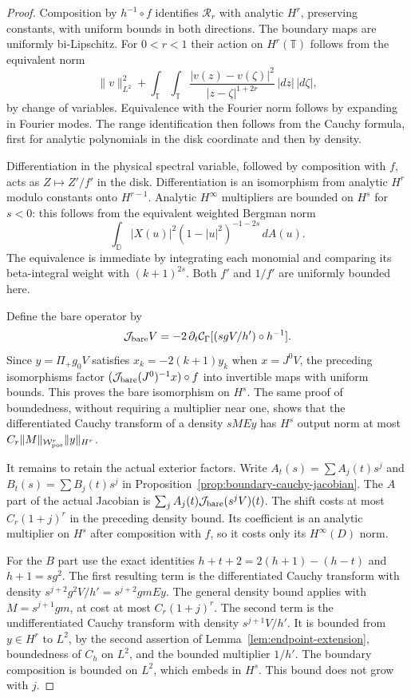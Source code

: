 \documentclass[11pt]{article}
\newcommand{\T}{\mathbb T}
\begin{document}
\begin{proof}
Composition by $h^{-1}\circ f$ identifies $\mathcal R_r$ with
analytic $H^r$, preserving constants, with uniform bounds in
both directions. The boundary maps are uniformly bi-Lipschitz.
For $0<r<1$ their action on $H^r(\T)$ follows from the
equivalent norm
\[
 \|v\|_{L^2}^2+
  \int_\T\int_\T
     \frac{|v(z)-v(\zeta)|^2}{|z-\zeta|^{1+2r}}
                       \,|dz|\,|d\zeta|,
\]
by change of variables. Equivalence with the Fourier norm
follows by expanding in Fourier modes. The range identification
then follows from the Cauchy formula, first for analytic
polynomials in the disk coordinate and then by density.

Differentiation in the physical spectral variable, followed by
composition with $f$, acts as $Z\mapsto Z'/f'$ in the disk.
Differentiation is an isomorphism from analytic $H^r$ modulo
constants onto $H^{r-1}$. Analytic $H^\infty$ multipliers are
bounded on $H^s$ for $s<0$: this follows from the equivalent
weighted Bergman norm
\[
 \int_{\mathbb D}|X(u)|^2(1-|u|^2)^{-1-2s}\,dA(u).
\]
The equivalence is immediate by integrating each monomial
and comparing its beta-integral weight with $(k+1)^{2s}$.
Both $f'$ and $1/f'$ are uniformly bounded here.

Define the bare operator by
\[
 \mathcal J_{\rm bare}V
  =-2\,\partial_t\mathcal C_\Gamma[(sgV/h')\circ h^{-1}].
\]
Since $y=\Pi_+g_0V$ satisfies $x_k=-2(k+1)y_k$ when
$x=J^0V$, the preceding isomorphisms factor
$(\mathcal J_{\rm bare}(J^0)^{-1}x)\circ f$
into invertible maps with uniform bounds. This proves the bare
isomorphism on $H^s$. The same proof of boundedness, without
requiring a multiplier near one, shows that the differentiated
Cauchy transform of a density $sM Ey$ has $H^s$ output norm
at most $C_r\|M\|_{\mathcal W_{\rm pos}^r}\|y\|_{H^r}$.

It remains to retain the actual exterior factors. Write
$A_t(s)=\sum A_j(t)s^j$ and $B_t(s)=\sum B_j(t)s^j$ in
Proposition~\ref{prop:boundary-cauchy-jacobian}.
The $A$ part of the actual Jacobian is
$\sum_j A_j(t)\mathcal J_{\rm bare}(s^jV)(t)$.
The shift costs at most $C_r(1+j)^r$ in the preceding density
bound. Its coefficient is an analytic multiplier on $H^s$
after composition with $f$, so it costs only its $H^\infty(D)$
norm.

For the $B$ part use the exact identities
$h+t+2=2(h+1)-(h-t)$ and $h+1=sg^2$.
The first resulting term is the differentiated Cauchy transform
with density $s^{j+2}g^2V/h'=s^{j+2}gm Ey$.
The general density bound applies with $M=s^{j+1}gm$, at
cost at most $C_r(1+j)^r$. The second term is the
undifferentiated Cauchy transform with density $s^{j+1}V/h'$.
It is bounded from $y\in H^r$ to $L^2$, by the second assertion
of Lemma~\ref{lem:endpoint-extension}, boundedness of $C_h$ on
$L^2$, and the bounded multiplier $1/h'$. The boundary
composition is bounded on $L^2$, which embeds in $H^s$.
This bound does not grow with $j$.


\end{proof}
\end{document}
